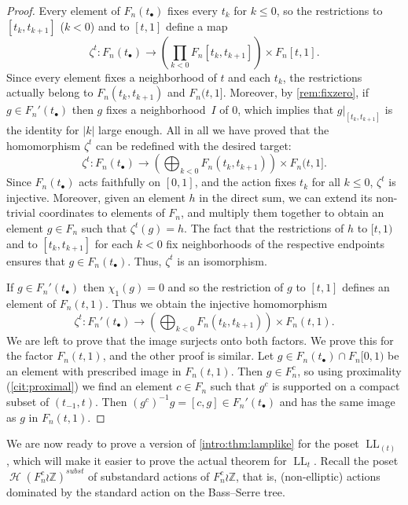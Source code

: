 \documentclass[reqno,12pt]{amsart}\setcounter{tocdepth}{1}
\theoremstyle{definition}
\newcommand{\Z}{\mathbb{Z}}
\DeclareMathOperator{\Hyp}{\mathcal{H}}
\DeclareMathOperator{\LL}{LL}
\numberwithin{equation}{section}
\begin{document}
\begin{proof}
Every element of $F_n(t_\bullet)$ fixes every $t_k$ for $k \leq 0$, so the restrictions to $[t_{k}, t_{k+1}]$ ($k<0$) and to $[t, 1]$ define a map
\[\zeta^t \colon F_n(t_\bullet) \to \left( \prod_{k < 0} F_n[t_{k}, t_{k+1}] \right) \times F_n[t, 1].\]
Since every element fixes a neighborhood of $t$ and each $t_k$, the restrictions actually belong to $F_n(t_{k}, t_{k+1})$ and $F_n(t, 1]$. Moreover, by \cref{rem:fixzero}, if $g \in F_n'(t_\bullet)$ then $g$ fixes a neighborhood~$I$ of $0$, which implies that $g|_{[t_{k}, t_{k+1}]}$ is the identity for $|k|$ large enough. All in all we have proved that the homomorphism $\zeta^t$ can be redefined with the desired target:
\[\zeta^t \colon F_n(t_\bullet) \to \left( \bigoplus_{k < 0} F_n(t_{k}, t_{k+1}) \right) \times F_n(t, 1].\]
Since $F_n(t_\bullet)$ acts faithfully on $[0, 1]$, and the action fixes $t_k$ for all $k\le 0$, $\zeta^t$ is injective. Moreover, given an element $h$ in the direct sum, we can extend its non-trivial coordinates to elements of $F_n$, and multiply them together to obtain an element $g \in F_n$ such that $\zeta^t(g) = h$. The fact that the restrictions of $h$ to $[t, 1)$ and to $[t_{k}, t_{k+1}]$ for each $k<0$ fix neighborhoods of the respective endpoints ensures that $g \in F_n(t_\bullet)$. Thus, $\zeta^t$ is an isomorphism.

If $g \in F_n'(t_\bullet)$ then $\chi_1(g) = 0$ and so the restriction of $g$ to $[t, 1]$ defines an element of $F_n(t, 1)$. Thus we obtain the injective homomorphism
\[\zeta^t \colon F_n'(t_\bullet) \to \left( \bigoplus_{k < 0} F_n(t_{k}, t_{k+1}) \right) \times F_n(t, 1).\]
We are left to prove that the image surjects onto both factors. We prove this for the factor $F_n(t, 1)$, and the other proof is similar. Let $g \in F_n(t_\bullet) \cap F_n[0, 1)$ be an element with prescribed image in $F_n(t, 1)$. Then $g \in F_n^c$, so using proximality (\cref{cit:proximal}) we find an element $c \in F_n$ such that $g^c$ is supported on a compact subset of $(t_{-1}, t)$. Then $(g^c)^{-1} g = [c, g] \in F_n'(t_\bullet)$ and has the same image as $g$ in $F_n(t, 1)$.
\end{proof}

We are now ready to prove a version of \cref{intro:thm:lamplike} for the poset $\LL_{(t)}$, which will make it easier to prove the actual theorem for $\LL_t$. Recall the poset $\Hyp(F_n^c \wr \Z)^{subst}$ of substandard actions of $F_n^c \wr \Z$, that is, (non-elliptic) actions dominated by the standard action on the Bass--Serre tree.
\end{document}
